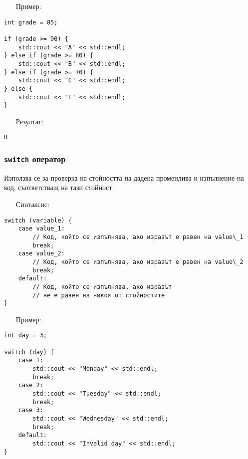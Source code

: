 \documentclass[oneside]{book}
\newcommand*{\code}[1]{\texttt{#1}}
\begin{document}
\begin{itemize}\item[Пример:]\end{itemize}\vspace{-6pt}
\begin{mdframed}\begin{lstlisting}
int grade = 85;

if (grade >= 90) {
    std::cout << "A" << std::endl;
} else if (grade >= 80) {
    std::cout << "B" << std::endl;
} else if (grade >= 70) {
    std::cout << "C" << std::endl;
} else {
    std::cout << "F" << std::endl;
}
\end{lstlisting}\end{mdframed}
\pagebreak
\begin{itemize}\item[Резултат:]\end{itemize}\vspace{-18pt}
\begin{mdframed}\begin{lstlisting}[language={}]
B
\end{lstlisting}\end{mdframed}

\subsubsection{\code{switch} оператор}\label{sec:switch}
Използва се за проверка на стойността на дадена променлива и изпълнение на код, съответстващ на тази стойност.

\begin{itemize}\item[Синтаксис:]\end{itemize}\vspace{-12pt}
\begin{mdframed}\begin{lstlisting}
switch (variable) {
    case value_1:
        // Код, който се изпълнява, ако изразът е равен на value\_1
        break;
    case value_2:
        // Код, който се изпълнява, ако изразът е равен на value\_2
        break;
    default:
        // Код, който се изпълнява, ако изразът
        // не е равен на никоя от стойностите
}
\end{lstlisting}\end{mdframed}\vspace{-16pt}

\begin{itemize}\item[Пример:]\end{itemize}\vspace{-12pt}
\begin{mdframed}\begin{lstlisting}
int day = 3;

switch (day) {
    case 1:
        std::cout << "Monday" << std::endl;
        break;
    case 2:
        std::cout << "Tuesday" << std::endl;
        break;
    case 3:
        std::cout << "Wednesday" << std::endl;
        break;
    default:
        std::cout << "Invalid day" << std::endl;
}
\end{lstlisting}\end{mdframed}\vspace{-16pt}
\end{document}
